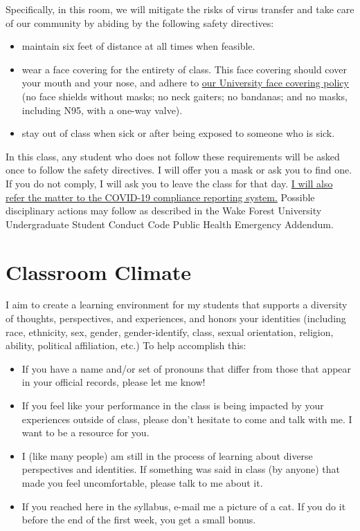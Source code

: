 \documentclass[11pt,]{article}
\providecommand{\tightlist}{%
  \setlength{\itemsep}{0pt}\setlength{\parskip}{0pt}}
\begin{document}
Specifically, in this room, we will mitigate the risks of virus transfer
and take care of our community by abiding by the following safety
directives:

\begin{itemize}
\tightlist
\item
  maintain six feet of distance at all times when feasible.
\item
  wear a face covering for the entirety of class. This face covering
  should cover your mouth and your nose, and adhere to
  \href{https://drive.google.com/file/d/1Hc_yL-Pzec2TdfPTgrC18Cb96vympsbI/view}{our
  University face covering policy} (no face shields without masks; no
  neck gaiters; no bandanas; and no masks, including N95, with a one-way
  valve).
\item
  stay out of class when sick or after being exposed to someone who is
  sick.
\end{itemize}

In this class, any student who does not follow these requirements will
be asked once to follow the safety directives. I will offer you a mask
or ask you to find one. If you do not comply, I will ask you to leave
the class for that day.
\href{https://cm.maxient.com/reportingform.php?WakeForestUniv\&layout_id=40}{I
will also refer the matter to the COVID-19 compliance reporting system.}
Possible disciplinary actions may follow as described in the Wake Forest
University Undergraduate Student Conduct Code Public Health Emergency
Addendum.

\hypertarget{classroom-climate}{%
\section{Classroom Climate}\label{classroom-climate}}

I aim to create a learning environment for my students that supports a
diversity of thoughts, perspectives, and experiences, and honors your
identities (including race, ethnicity, sex, gender, gender-identify,
class, sexual orientation, religion, ability, political affiliation,
etc.) To help accomplish this:

\begin{itemize}
\item
  If you have a name and/or set of pronouns that differ from those that
  appear in your official records, please let me know!
\item
  If you feel like your performance in the class is being impacted by
  your experiences outside of class, please don't hesitate to come and
  talk with me. I want to be a resource for you.
\item
  I (like many people) am still in the process of learning about diverse
  perspectives and identities. If something was said in class (by
  anyone) that made you feel uncomfortable, please talk to me about it.
\item
  If you reached here in the syllabus, e-mail me a picture of a cat. If
  you do it before the end of the first week, you get a small bonus.
\end{itemize}
\end{document}
